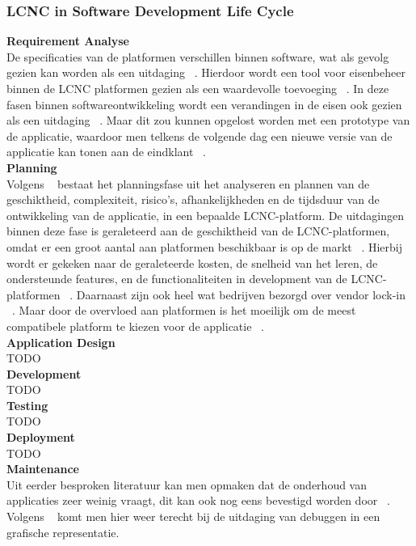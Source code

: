 \subsubsection*{LCNC in Software Development Life Cycle}
\label{subsec:lcnc-binnen-agile}
\textbf{Requirement Analyse}
\\
De specificaties van de platformen verschillen binnen software, wat als gevolg gezien kan worden als een
uitdaging ~\autocite{Rokis_2022}. Hierdoor wordt een tool voor eisenbeheer binnen de LCNC platformen
gezien als een waardevolle toevoeging ~\autocite{Rokis_2022}. In deze fasen binnen softwareontwikkeling wordt een verandingen in de eisen
ook gezien als een uitdaging ~\autocite{Rokis_2022}.  Maar  dit zou kunnen opgelost worden met een prototype van de applicatie,
waardoor men telkens de volgende dag een nieuwe versie van de applicatie kan tonen aan de eindklant ~\autocite{Rokis_2022}.
\\
\textbf{Planning}
\\
Volgens ~\textcite{Rokis_2022} bestaat het planningsfase uit het analyseren en plannen van de geschiktheid, complexiteit, risico's, afhankelijkheden en de tijdsduur van de ontwikkeling van de applicatie, in een bepaalde LCNC-platform.
De uitdagingen binnen deze fase is geraleteerd aan de geschiktheid van de LCNC-platformen, omdat er een groot aantal aan platformen beschikbaar is op de markt ~\autocite{Rokis_2022}.
Hierbij wordt er gekeken naar de geraleteerde kosten, de snelheid van het leren, de ondersteunde features, en de functionaliteiten in development van de LCNC-platformen ~\autocite{Rokis_2022}.
Daarnaast zijn ook heel wat bedrijven bezorgd over vendor lock-in ~\autocite{Rokis_2022}.
Maar door de overvloed aan platformen is het moeilijk om de meest compatibele platform te kiezen voor de applicatie ~\autocite{Rokis_2022}.
\\
\textbf{Application Design}
\\
TODO
\\
\textbf{Development}
\\
TODO
\\
\textbf{Testing}
\\
TODO
\\
\textbf{Deployment}
\\
TODO
\\
\textbf{Maintenance}
\\
Uit eerder besproken literatuur kan men opmaken dat de onderhoud van applicaties zeer weinig vraagt, dit kan ook nog eens bevestigd worden door ~\textcite{Rokis_2022}.
Volgens ~\textcite{Rokis_2022} komt men hier weer terecht bij de uitdaging van debuggen in een grafische representatie.


